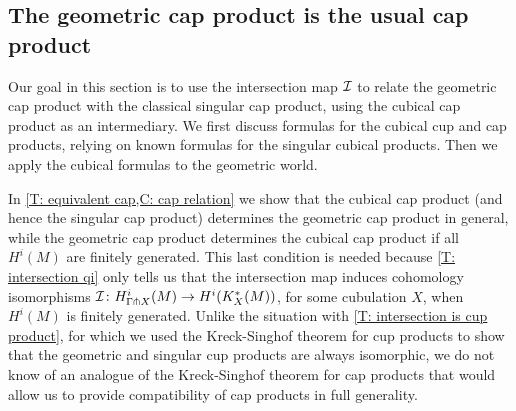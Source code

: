 \begin{comment}
	The following is now standard homological algebra:
	\begin{corollary}
		The external cochain cross product induces an \textbf{(external) cohomology cross product} $H^i_\Gamma(M) \otimes H^j_\Gamma(N) \to H^{i+j}_\Gamma(M \times N)$.
	\end{corollary}

	\begin{theorem}
		Let $M$ and $N$ be manifolds.
		Then the geometric cohomology cross product $H^i_\Gamma(M) \otimes H^j_\Gamma(N) \to H^{i+j}_\Gamma(M \times N)$ is isomorphic to the singular cohomology cross product $H^i(M) \otimes H^j(N) \to H^{i+j}(M \times N)$.
	\end{theorem}

	\begin{proof}
		NEED MORE GENERAL INTERSECTION MAP THEOREM OR TO RESTRICT TO COMPACT MANIFOLDS

	\end{proof}
\end{comment}

\subsection{The geometric cap product is the usual cap product}

Our goal in this section is to use the intersection map $\mathcal{I}$ to relate the geometric cap product with the classical singular cap product, using the cubical cap product as an intermediary.
We first discuss formulas for the cubical cup and cap products, relying on known formulas for the singular cubical products.
Then we apply the cubical formulas to the geometric world.

In \cref{T: equivalent cap,C: cap relation} we show that the cubical cap product (and hence the singular cap product) determines the geometric cap product in general, while the geometric cap product determines the cubical cap product if all $H^i(M)$ are finitely generated.
This last condition is needed because \cref{T: intersection qi} only tells us that the intersection map induces cohomology isomorphisms $\mathcal{I} \colon H^i_{\Gamma \pitchfork X}(M) \to H^i(K_X^*(M))$, for some cubulation $X$, when $H^i(M)$ is finitely generated.
Unlike the situation with \cref{T: intersection is cup product}, for which we used the Kreck-Singhof theorem for cup products to show that the geometric and singular cup products are always isomorphic, we do not know of an analogue of the Kreck-Singhof theorem for cap products that would allow us to provide compatibility of cap products in full generality.

